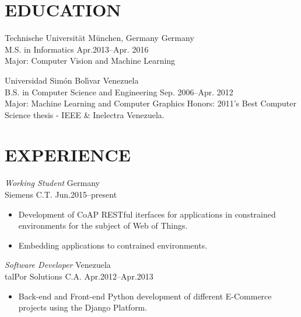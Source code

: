 \documentclass[margin, 10pt]{res} %
\begin{document}
\begin{resume}


\section{EDUCATION}

{Technische Universit\"at M\"unchen, Germany \hfill Germany}\\
{M.S. in Informatics \hfill Apr.2013--Apr. 2016}\\
{Major: Computer Vision and Machine Learning}
 
{Universidad Sim\'on Bol\'{\i}var \hfill Venezuela}\\
{B.S. in Computer Science and Engineering \hfill Sep. 2006--Apr. 2012}\\
{Major: Machine Learning and Computer Graphics}
{Honors: 2011's Best Computer Science thesis - IEEE \& Inelectra Venezuela.}

 
 
\section{EXPERIENCE}

{{\sl Working Student} \hfill Germany}\\
{Siemens C.T. \hfill Jun.2015--present}\\
\begin{itemize} \itemsep-2pt %
\item Development of CoAP RESTful iterfaces for applications  
  in constrained environments for the subject of Web of Things.
\item Embedding applications to contrained environments.
\end{itemize}

{{\sl Software Developer} \hfill Venezuela}\\
{talPor Solutions C.A. \hfill Apr.2012--Apr.2013}\\
\begin{itemize} \itemsep-2pt %
\item Back-end and Front-end Python development of different E-Commerce projects
  using the Django Platform. 
\end{itemize}
 

\end{resume}
\end{document}
